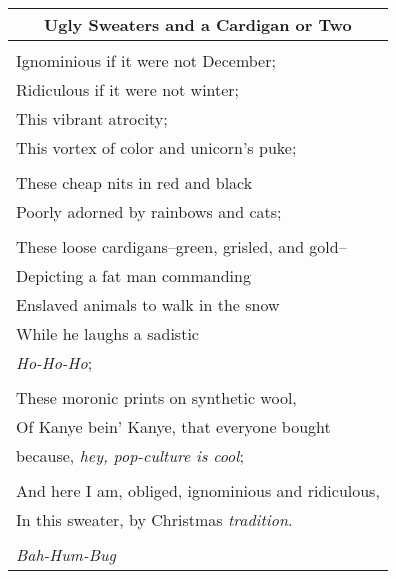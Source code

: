 \documentclass{article}
\begin{document}
\newcommand{\h}{\hspace*{2ex}}
\newcommand{\hh}{\hspace*{4ex}}
\newcommand{\hhh}{\hspace*{6ex}}

\begin{center}
\begin{tabular}{l}
\multicolumn{1}{c}{\textbf{Ugly Sweaters and a Cardigan or Two}} \\\hline
\\
Ignominious if it were not December; \\
Ridiculous if it were not winter; \\
This vibrant atrocity; \\
This vortex of color and unicorn's puke; \\
\\
These cheap nits in red and black \\
Poorly adorned by rainbows and cats; \\
\\
These loose cardigans--green, grisled, and gold-- \\
Depicting a fat man commanding \\
Enslaved animals to walk in the snow \\
While he laughs a sadistic \\
\textit{Ho-Ho-Ho}; \\
\\
These moronic prints on synthetic wool, \\
Of Kanye bein' Kanye, that everyone bought \\
because, \textit{hey, pop-culture is cool}; \\
\\
And here I am, obliged, ignominious and ridiculous, \\
In this sweater, by Christmas \textit{tradition}. \\
\\
\textit{Bah-Hum-Bug} \\
\end{tabular}
\end{center}
\end{document}
